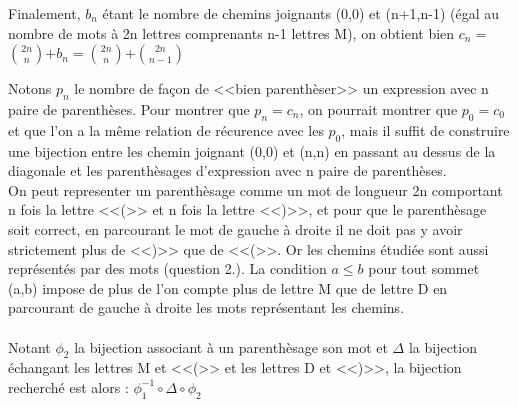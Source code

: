 \documentclass[a4paper, 10pt]{article}
\begin{document}
\begin{enumerate}
{	Finalement, \(b_{n}\) étant le nombre de chemins joignants (0,0) et (n+1,n-1) (égal au nombre de mots à 2n lettres comprenants n-1 lettres M), on obtient bien 
	\( c_{n} = \)\( 2n\choose n\)\(+ b_{n} = \)\( 2n\choose n\)+\( 2n\choose n-1\)

	\item Notons \(p_{n}\) le nombre de façon de <<bien parenthèser>> un expression avec n paire de parenthèses.
	Pour montrer que \(p_{n} = c_{n}\), on pourrait montrer que \(p_{0} = c_{0}\) et que l'on a la même relation de récurence avec les \(p_{0}\), mais il suffit de construire une bijection entre les chemin joignant (0,0) et (n,n) en passant au dessus de la diagonale et les parenthèsages d'expression avec n paire de parenthèses. \\ 
	On peut representer un parenthèsage comme un mot de longueur 2n comportant n fois la lettre <<(>> et n fois la lettre <<)>>, et pour que le parenthèsage soit correct, en parcourant le mot de gauche à droite il ne doit pas y avoir strictement plus de <<)>> que de <<(>>. Or les chemins étudiée sont aussi représentés par des mots (question 2.). La condition \(a \leq b \) pour tout sommet (a,b) impose de plus de l'on compte plus de lettre M que de lettre D en parcourant de gauche à droite les mots représentant les chemins.
	\\ \\ Notant \(\phi_{2}\) la bijection associant à un parenthèsage son mot et \(\Delta\) la bijection échangant les lettres M et <<(>> et les lettres D et <<)>>, la bijection recherché est alors :
	\( \phi_{1}^{-1} \circ \Delta \circ \phi_{2}\)}


\end{enumerate}
\end{document}
